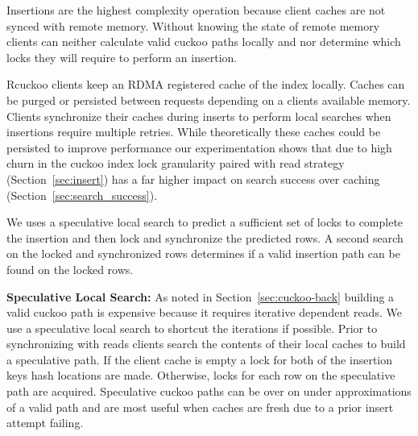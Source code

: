 Insertions are the highest complexity operation because
client caches are not synced with remote memory. Without
knowing the state of remote memory clients can neither
calculate valid cuckoo paths locally and nor determine which
locks they will require to perform an insertion.


Rcuckoo clients keep an RDMA registered cache of the index
locally. Caches can be purged or persisted between requests
depending on a clients available memory. Clients synchronize
their caches during inserts to perform local searches when
insertions require multiple retries. While theoretically
these caches could be persisted to improve performance our
experimentation shows that due to high churn in the cuckoo
index lock granularity paired with read strategy
(Section~\ref{sec:insert}) has a far higher impact on search
success over caching (Section~\ref{sec:search_success}).




We uses a
speculative local search to predict a sufficient set of
locks to complete the insertion and then lock and
synchronize the predicted rows. A second search on the
locked and synchronized rows determines if a valid insertion
path can be found on the locked rows.

\textbf{Speculative Local Search:} As noted in
Section~\ref{sec:cuckoo-back} building a valid cuckoo path
is expensive because it requires iterative dependent reads.
We use a speculative local search to shortcut the iterations
if possible. Prior to synchronizing with reads clients
search the contents of their local caches to build a
speculative path. If the client cache is empty a lock for
both of the insertion keys hash locations are made.
Otherwise, locks for each row on the speculative path are
acquired. Speculative cuckoo paths can be over on under
approximations of a valid path and are most useful when
caches are fresh due to a prior insert attempt failing.

